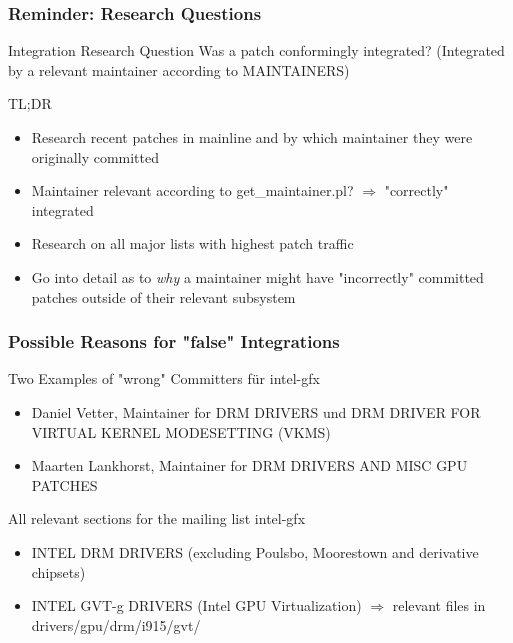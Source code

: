 \documentclass{beamer}
\begin{document}
	\begin{frame}
	\frametitle{Reminder: Research Questions}
		\begin{alertblock}{Integration Research Question}
		Was a patch conformingly integrated? (Integrated by a relevant maintainer according to MAINTAINERS)
		\end{alertblock}

		\begin{block}{TL;DR}
			\begin{itemize}
				\item Research recent patches in mainline and by which maintainer they were originally committed
				\item Maintainer relevant according to get\_maintainer.pl? $\Rightarrow$ "correctly" integrated
				\item Research on all major lists with highest patch traffic
				\item Go into detail as to \textit{why} a maintainer might have "incorrectly" committed patches outside of their relevant subsystem
			\end{itemize}
		\end{block}
	\end{frame}



	\begin{frame}
	\frametitle{Possible Reasons for "false" Integrations}
	\begin{block}{Two Examples of "wrong" Committers für intel-gfx}
		\begin{itemize}
			\item Daniel Vetter, Maintainer for DRM DRIVERS und DRM DRIVER FOR VIRTUAL KERNEL MODESETTING (VKMS)
			\item Maarten Lankhorst, Maintainer for DRM DRIVERS AND MISC GPU PATCHES
		\end{itemize}
	\end{block}
	\begin{block}{All relevant sections for the mailing list intel-gfx}
		\begin{itemize}
			\item INTEL DRM DRIVERS (excluding Poulsbo, Moorestown and derivative chipsets)
			\item INTEL GVT-g DRIVERS (Intel GPU Virtualization) $\Rightarrow$ relevant files in drivers/gpu/drm/i915/gvt/ %
		\end{itemize}
	\end{block}
	\end{frame}
\end{document}
